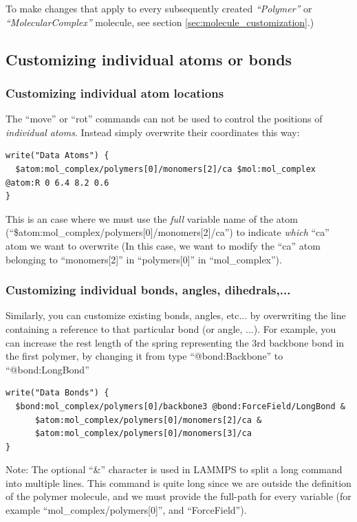 \documentclass[11pt]{article}
\begin{document}
To make changes that apply to every subsequently created \textit{``Polymer''}
or \textit{``MolecularComplex''} molecule,
see section \ref{sec:molecule_customization}.)


\subsection{Customizing individual atoms or bonds}

\subsubsection{Customizing individual atom locations}
\label{sec:custom_atom}
The ``move'' or ``rot'' commands can not be used to control the positions
of \textit{individual atoms}.
Instead simply overwrite their coordinates this way:
\begin{verbatim}
write("Data Atoms") {
  $atom:mol_complex/polymers[0]/monomers[2]/ca $mol:mol_complex @atom:R 0 6.4 8.2 0.6
}
\end{verbatim}
This is an case where we must use the \textit{full} variable name of the atom
(``\$atom:mol\_complex/polymers[0]/monomers[2]/ca'')
to indicate \textit{which} ``ca'' atom we want to overwrite
(In this case, we want to modify the ``ca'' atom belonging to
 ``monomers[2]'' in ``polymers[0]'' in ``mol\_complex'').

\subsubsection{Customizing individual bonds, angles, dihedrals,...}
\label{sec:custom_bond}
Similarly, you can customize existing bonds, angles, etc... by overwriting the
line containing a reference to that particular bond (or angle, ...).
For example, you can increase the rest length of the spring representing
the 3rd backbone bond in the first polymer, 
by changing it from type ``@bond:Backbone'' to ``@bond:LongBond''
\begin{verbatim}
write("Data Bonds") {
  $bond:mol_complex/polymers[0]/backbone3 @bond:ForceField/LongBond &
      $atom:mol_complex/polymers[0]/monomers[2]/ca &
      $atom:mol_complex/polymers[0]/monomers[3]/ca 
}
\end{verbatim}
Note: The optional ``\&'' character is used in LAMMPS to split a long command
into multiple lines.
This command is quite long since we are outside the definition
of the polymer molecule, and we must provide the full-path for every variable
(for example ``mol\_complex/polymers[0]'', and ``ForceField'').
\end{document}
